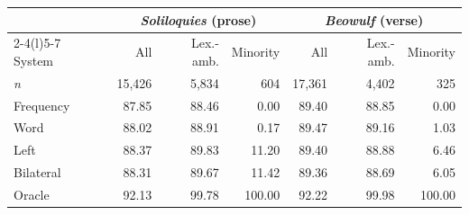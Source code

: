 \begin{tabular}{@{}lrrrrrr@{}}
\toprule
 & \multicolumn{3}{c}{\textit{Soliloquies} (prose)} & \multicolumn{3}{c}{\textit{Beowulf} (verse)} \\
\cmidrule(lr){2-4}\cmidrule(l){5-7}
System & All & Lex.-amb. & Minority & All & Lex.-amb. & Minority \\
\textit{n} & 15,426 & 5,834 & 604 & 17,361 & 4,402 & 325 \\
\midrule
Frequency & 87.85 & 88.46 & 0.00 & 89.40 & 88.85 & 0.00 \\
Word & 88.02 & 88.91 & 0.17 & 89.47 & 89.16 & 1.03 \\
Left & 88.37 & 89.83 & 11.20 & 89.40 & 88.88 & 6.46 \\
Bilateral & 88.31 & 89.67 & 11.42 & 89.36 & 88.69 & 6.05 \\
Oracle & 92.13 & 99.78 & 100.00 & 92.22 & 99.98 & 100.00 \\
\bottomrule
\end{tabular}
